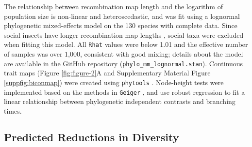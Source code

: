 \documentclass[11pt]{article}
\begin{document}
The relationship between recombination map length and the logarithm of
population size is non-linear and heteroscedastic, and was fit using a
lognormal phylogenetic mixed-effects model on the 130 species with complete
data. Since social insects have longer recombination map lengths
\parencite{Wilfert2007-dx}, social taxa were excluded when fitting this model.
All \texttt{Rhat} \parencite{Vehtari2019-po} values were below 1.01 and the
effective number of samples was over 1,000, consistent with good mixing;
details about the model are available in the GitHub repository
(\texttt{phylo\_mm\_lognormal.stan}). Continuous trait maps (Figure
\ref{fig:figure-2}A and Supplementary Material Figure \ref{suppfig:biconmap})
were created using \texttt{phytools} \parencite{Revell2012-zq}. Node-height
tests were implemented based on the methods in \texttt{Geiger}
\parencite{Pennell2014-nx,Harmon2008-tr}, and use robust regression to fit a
linear relationship between phylogenetic independent contrasts and branching
times.

\subsection*{Predicted Reductions in Diversity}
\label{sec:methods-reduction}
\end{document}

